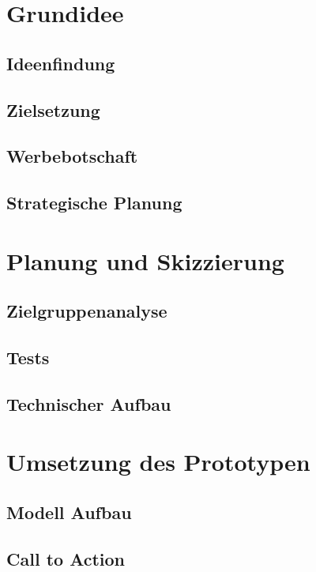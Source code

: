 







\tableofcontents
\clearpage



\section{Grundidee}
\subsection{Ideenfindung}
\subsection{Zielsetzung}
\subsection{Werbebotschaft}
\subsection{Strategische Planung}

\section{Planung und Skizzierung}
\subsection{Zielgruppenanalyse}
\subsection{Tests}
\subsection{Technischer Aufbau}

\section{Umsetzung des Prototypen}
\subsection{Modell Aufbau}



\subsection{Call to Action}
